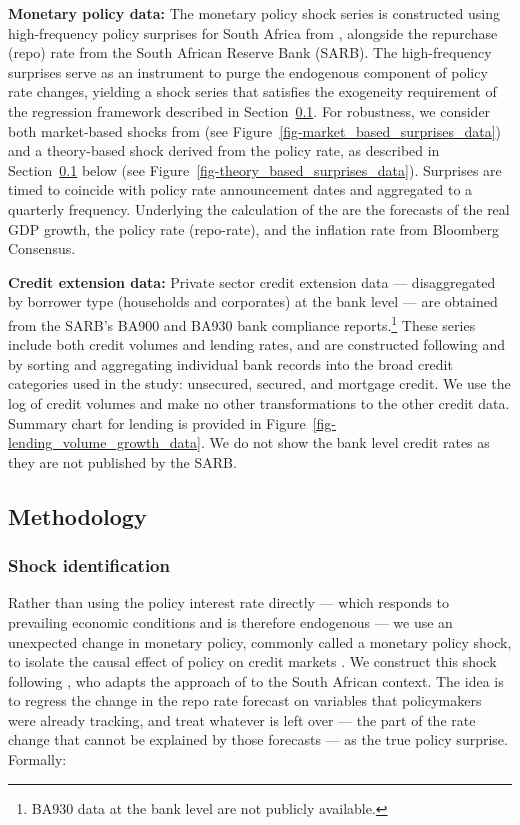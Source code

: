 \documentclass[
  letterpaper,
  DIV=11,
  numbers=noendperiod]{scrartcl}
\begin{document}
\textbf{Monetary policy data:} The monetary policy shock series is
constructed using high-frequency policy surprises for South Africa from
\citet{pirozhkova2025}, alongside the repurchase (repo) rate from the
South African Reserve Bank (SARB). The high-frequency surprises serve as
an instrument to purge the endogenous component of policy rate changes,
yielding a shock series that satisfies the exogeneity requirement of the
regression framework described in Section~\ref{sec-methodology}. For
robustness, we consider both market-based shocks from
\citet{pirozhkova2025} (see
Figure~\ref{fig-market_based_surprises_data}) and a theory-based shock
derived from the policy rate, as described in
Section~\ref{sec-methodology} below (see
Figure~\ref{fig-theory_based_surprises_data}). Surprises are timed to
coincide with policy rate announcement dates and aggregated to a
quarterly frequency. Underlying the calculation of the are the forecasts
of the real GDP growth, the policy rate (repo-rate), and the inflation
rate from Bloomberg Consensus.

\textbf{Credit extension data:} Private sector credit extension data ---
disaggregated by borrower type (households and corporates) at the bank
level --- are obtained from the SARB's BA900 and BA930 bank compliance
reports.\footnote{BA930 data at the bank level are not publicly
  available.} These series include both credit volumes and lending
rates, and are constructed following \citet{sibande2025} and
\citet{sibande2025a} by sorting and aggregating individual bank records
into the broad credit categories used in the study: unsecured, secured,
and mortgage credit. We use the log of credit volumes and make no other
transformations to the other credit data. Summary chart for lending is
provided in Figure~\ref{fig-lending_volume_growth_data}. We do not show
the bank level credit rates as they are not published by the SARB.

\subsection{Methodology}\label{sec-methodology}

\subsubsection{Shock identification}\label{shock-identification}

Rather than using the policy interest rate directly --- which responds
to prevailing economic conditions and is therefore endogenous --- we use
an unexpected change in monetary policy, commonly called a monetary
policy shock, to isolate the causal effect of policy on credit markets
\citep{miyajima2024}. We construct this shock following
\citet{merrino2022}, who adapts the approach of \citet{romer2004} to the
South African context. The idea is to regress the change in the repo
rate forecast on variables that policymakers were already tracking, and
treat whatever is left over --- the part of the rate change that cannot
be explained by those forecasts --- as the true policy surprise.
Formally:
\end{document}
